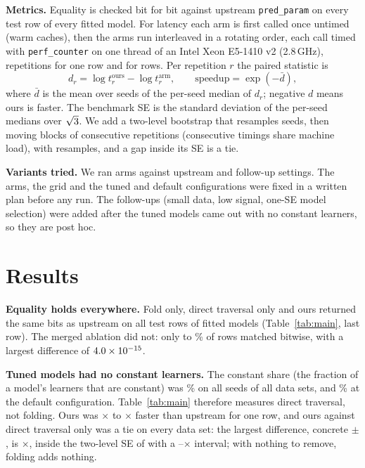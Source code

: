 \documentclass{article}
\begin{document}
\textbf{Metrics.} Equality is checked bit for bit against upstream \texttt{pred\_param} on every test row of every fitted model. For latency each arm is first called once untimed (warm caches), then the arms run interleaved in a rotating order, each call timed with \texttt{perf\_counter} on one thread of an Intel Xeon E5-1410 v2 (2.8\,GHz), \nRepsOne{} repetitions for one row and \nRepsHundred{} for \nHundredRows{} rows. Per repetition $r$ the paired statistic is
\begin{equation}
d_r = \log t^{\text{ours}}_r - \log t^{\text{arm}}_r, \qquad \text{speedup} = \exp(-\bar d),
\label{eq:ratio}
\end{equation}
where $\bar d$ is the mean over seeds of the per-seed median of $d_r$; negative $d$ means ours is faster. The benchmark SE is the standard deviation of the per-seed medians over $\sqrt{3}$. We add a two-level bootstrap \citep{lahiri2003resampling} that resamples seeds, then moving blocks of \nBlockLen{} consecutive repetitions (consecutive timings share machine load), with \nBootResamples{} resamples, and a gap inside its SE is a tie.

\textbf{Variants tried.} We ran \nArmsTried{} arms against upstream and \nVariantsTried{} follow-up settings. The arms, the grid and the tuned and default configurations were fixed in a written plan before any run. The follow-ups (small data, low signal, one-SE model selection) were added after the tuned models came out with no constant learners, so they are post hoc.

\section{Results}
\label{sec:results}

\textbf{Equality holds everywhere.} Fold only, direct traversal only and ours returned the same bits as upstream on all \nEqRowsTotal{} test rows of \nEqModelsTotal{} fitted models (Table~\ref{tab:main}, last row). The merged ablation did not: only \nYachtMergedBitwise{} to \nConcreteMergedBitwise\% of rows matched bitwise, with a largest difference of $4.0\times 10^{-15}$.

\textbf{Tuned models had no constant learners.} The constant share (the fraction of a model's learners that are constant) was \nConcreteTunedShareMax\% on all \nConcreteSeeds{} seeds of all \nDataSets{} data sets, and \nConcreteDefaultShareMax\% at the default configuration. Table~\ref{tab:main} therefore measures direct traversal, not folding. Ours was \nCreditGOnePristineX$\times$ to \nConcreteOnePristineX$\times$ faster than upstream for one row, and ours against direct traversal only was a tie on every data set: the largest difference, concrete \nConcreteOneDirectLog{} $\pm$ \nConcreteOneDirectSE, is \nConcreteOneDirectX$\times$, inside the two-level SE of \nConcreteOneDirectBootSE{} with a \nConcreteOneDirectBootLo--\nConcreteOneDirectBootHi$\times$ interval; with nothing to remove, folding adds nothing.
\end{document}

